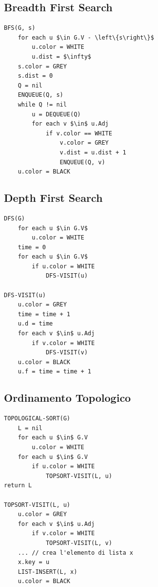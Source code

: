 \documentclass[10pt,a4paper]{article}
\begin{document}
\begin{multicols*}{2}
\vfill\mbox{}
\columnbreak

\subsection*{Breadth First Search}
\begin{lstlisting}
BFS(G, s)
    for each u $\in G.V - \left\{s\right\}$
        u.color = WHITE
        u.dist = $\infty$
    s.color = GREY
    s.dist = 0
    Q = nil
    ENQUEUE(Q, s)
    while Q != nil
        u = DEQUEUE(Q)
        for each v $\in$ u.Adj
            if v.color == WHITE
                v.color = GREY
                v.dist = u.dist + 1
                ENQUEUE(Q, v)
    u.color = BLACK
\end{lstlisting}
\subsection*{Depth First Search}
\begin{lstlisting}
DFS(G)
    for each u $\in G.V$
        u.color = WHITE
    time = 0
    for each u $\in G.V$
        if u.color = WHITE
            DFS-VISIT(u)

DFS-VISIT(u)
    u.color = GREY
    time = time + 1
    u.d = time
    for each v $\in$ u.Adj
        if v.color = WHITE
            DFS-VISIT(v)
    u.color = BLACK
    u.f = time = time + 1
\end{lstlisting}

\subsection*{Ordinamento Topologico}
\begin{lstlisting}
TOPOLOGICAL-SORT(G)
    L = nil
    for each u $\in$ G.V
        u.color = WHITE
    for each u $\in$ G.V
        if u.color = WHITE
            TOPSORT-VISIT(L, u)
return L

TOPSORT-VISIT(L, u)
    u.color = GREY
    for each v $\in$ u.Adj
        if v.color = WHITE
            TOPSORT-VISIT(L, v)
    ... // crea l'elemento di lista x
    x.key = u
    LIST-INSERT(L, x)
    u.color = BLACK
\end{lstlisting}
\end{multicols*}
\end{document}
